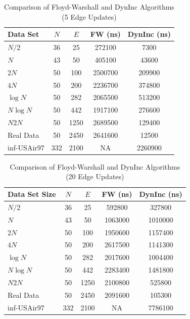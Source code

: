 \documentclass[conference]{IEEEtran}
\begin{document}
\begin{table}[htbp]
    \centering
    \caption{Comparison of Floyd-Warshall and DynInc Algorithms (5 Edge Updates)}
    \label{table:1}
    \begin{tabular}{|l|c|c|c|c|}
        \hline
        Data Set & $N$ & $E$ & FW (ns) & DynInc (ns) \\
        \hline
        $N/2$ & 36 & 25 & 272100 & 7300 \\
        \hline
        $N$ & 43 & 50 & 405100 & 43600 \\
        \hline
        $2N$ & 50 & 100 & 2500700 & 209900 \\
        \hline
        $4N$ & 50 & 200 & 2236700 & 374800 \\
        \hline
        $\log N$ & 50 & 282 & 2065500 & 513200 \\
        \hline
        $N \log N$ & 50 & 442 & 1917100 & 276600 \\
        \hline
        $N 2N$ & 50 & 1250 & 2689500 & 129400 \\
        \hline
        Real Data & 50 & 2450 & 2641600 & 12500 \\
        \hline
        inf-USAir97 & 332 & 2100 & NA & 2260900 \\
        \hline
    \end{tabular}
\end{table}

\begin{table}[htbp]
    \centering
    \caption{Comparison of Floyd-Warshall and DynInc Algorithms (20 Edge Updates)}
    \label{table:2}
    \begin{tabular}{|l|c|c|c|c|}
        \hline
        Data Set Size & $N$ & $E$ & FW (ns) & DynInc (ns) \\
        \hline
        $N/2$ & 36 & 25 & 592800 & 327800 \\
        \hline
        $N$ & 43 & 50 & 1063000 & 1010000 \\
        \hline
        $2N$ & 50 & 100 & 1950600 & 1157400 \\
        \hline
        $4N$ & 50 & 200 & 2617500 & 1141300 \\
        \hline
        $\log N$ & 50 & 282 & 2017600 & 1004400 \\
        \hline
        $N \log N$ & 50 & 442 & 2283400 & 1481800 \\
        \hline
        $N 2N$ & 50 & 1250 & 2100800 & 525800 \\
        \hline
        Real Data & 50 & 2450 & 2091600 & 105300 \\
        \hline
        inf-USAir97 & 332 & 2100 & NA  & 7786100 \\
        \hline
    \end{tabular}
\end{table}
\end{document}
